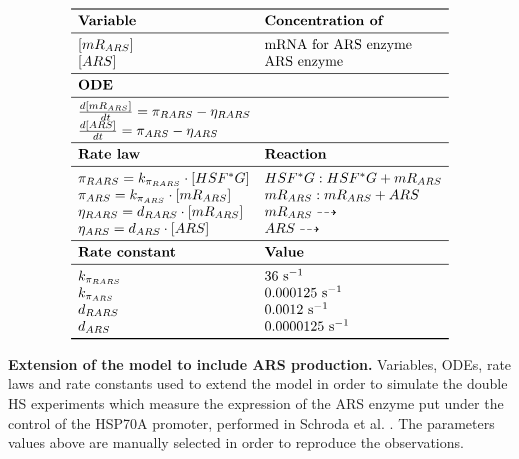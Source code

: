 \documentclass[oneside, 10pt, a4paper, twocolumn]{article}
\begin{document}
\bgroup
\def\arraystretch{1.5}%
\begin{table}%
\[\begin{array}{ll}
\toprule
  \text{\textbf{Variable}}                     & \text{\textbf{Concentration of}} \\
\midrule
  \left[mR_{ARS}\right]                        & \text{mRNA for ARS enzyme}          \\
  \left[ARS\right]                             & \text{ARS enzyme}                \\
\midrule
  \text{\textbf{ODE}}                         & \text{ }                         \\
\midrule
 \frac{d\left[mR_{ARS}\right]}{dt} = \pi_{RARS} - \eta_{RARS} & \text{ }          \\
 \frac{d\left[ARS\right]}{dt} = \pi_{ARS} - \eta_{ARS} & \text{ }                  \\
 \midrule
  \text{\textbf{Rate law}}                     & \text{\textbf{Reaction}}         \\
\midrule
  \pi_{RARS}  = k_{\pi_{RARS}} \cdot [HSF^*G]  & HSF^*G: HSF^*G + mR_{ARS}            \\
  \pi_{ARS}   = k_{\pi_{ARS}} \cdot [mR_{ARS}] & mR_{ARS}: mR_{ARS} + ARS           \\
  \eta_{RARS} = d_{{RARS}} \cdot [mR_{ARS}]    & mR_{ARS} \dashrightarrow         \\
  \eta_{ARS}  = d_{{ARS}} \cdot [ARS]          & ARS \dashrightarrow              \\
\midrule
 \text{\textbf{Rate constant}}                 & \text{\textbf{Value}}            \\
\midrule
    k_{\pi_{RARS}}                             & 36 \text{ s}^{-1}                \\
    k_{\pi_{ARS}}                              & 0.000125 \text{ s}^{-1}          \\
    d_{RARS}                                   & 0.0012 \text{ s}^{-1}            \\
    d_{ARS}                                    & 0.0000125 \text{ s}^{-1}         \\
\bottomrule
\end{array}\]
\caption{\textbf{Extension of the model to include ARS production.} Variables, ODEs, rate laws and rate constants used to extend the model in order to simulate the double HS experiments which measure the expression of the ARS enzyme put under the control of the HSP70A promoter, performed in Schroda et al. \cite{Schroda2000}. The parameters values above are manually selected in order to reproduce the observations.}\label{TabARS}
\end{table}
\egroup
\end{document}
